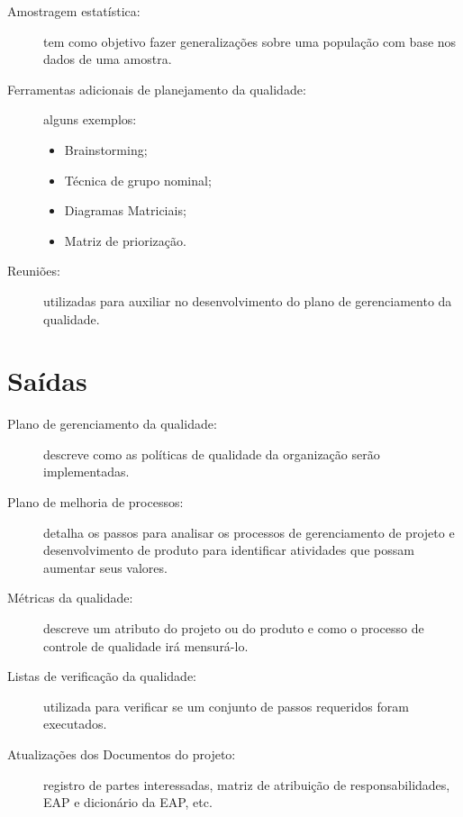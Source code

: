 \begin{description}
	\item[Amostragem estatística:] tem como objetivo fazer generalizações sobre uma população com base nos dados de uma amostra.
	
	\item[Ferramentas adicionais de planejamento da qualidade:] alguns exemplos:
	
	\begin{itemize}
		
			\item Brainstorming;
			
			\item Técnica de grupo nominal;
			
			\item Diagramas Matriciais;
			
			\item Matriz de priorização.
			
	\end{itemize}
		
	\item[Reuniões:] utilizadas para auxiliar no desenvolvimento do plano de gerenciamento da qualidade.
		
\end{description}

\section{Saídas}

\begin{description}
	
	\item[Plano de gerenciamento da qualidade:] descreve como as políticas de qualidade da organização serão implementadas.
	
	\item[Plano de melhoria de processos:] detalha os passos para analisar os processos de gerenciamento de projeto e desenvolvimento de produto para identificar atividades que possam aumentar seus valores.
	
	\item[Métricas da qualidade:] descreve um atributo do projeto ou do produto e como o processo de controle de qualidade irá mensurá-lo.
	
	\item[Listas de verificação da qualidade:] utilizada para verificar se um conjunto de passos requeridos foram executados.
	
	\item[Atualizações dos Documentos do projeto:] registro de partes interessadas, matriz de atribuição de responsabilidades, EAP e dicionário da EAP, etc.
		
\end{description}

